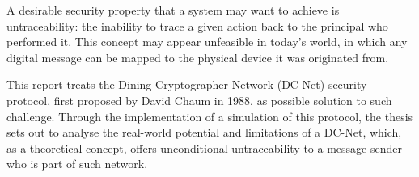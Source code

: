 A desirable security property that a system may want to achieve is untraceability: the inability to trace a given action back to the principal who performed it. This concept may appear unfeasible in today's world, in which any digital message can be mapped to the physical device it was originated from.


This report treats the Dining Cryptographer Network (DC-Net) security protocol, first proposed by David Chaum in 1988, as possible solution to such challenge. Through the implementation of a simulation of this protocol, the thesis sets out to analyse the real-world potential and limitations of a DC-Net, which, as a theoretical concept, offers unconditional untraceability to a message sender who is part of such network.
